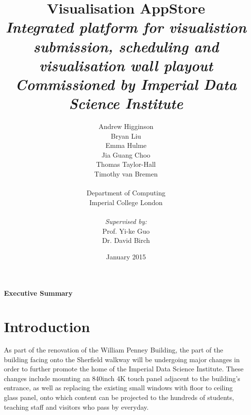 \documentclass[a4paper, titlepage]{article}
\title{Visualisation AppStore \\ \vspace{10pt}
\textit{\large Integrated platform for visualistion submission, scheduling and visualisation wall playout} \\ \vspace*{-5pt}
\textit{\large Commissioned by Imperial Data Science Institute}}
\author{Andrew Higginson\\ Bryan Liu \\ Emma Hulme \\ Jia Guang Choo \\
        Thomas Taylor-Hall \\ Timothy van Bremen \\\\ 
        Department of Computing \\ Imperial College London \\\\ \textit{Supervised by:} \\
        Prof. Yi-ke Guo \\ Dr. David Birch}
\date{January 2015}
\begin{document}
\maketitle


\newpage
{}
\Large
\textbf{Executive Summary}

\normalsize





\newpage
\tableofcontents
\listoffigures
\listoftables


\newpage
{}
\section{Introduction}
As part of the renovation of the William Penney Building, the part of the building facing onto the Sherfield walkway will be undergoing major changes in order to further promote the home of the Imperial Data Science Institute. These changes include mounting an 840inch 4K touch panel adjacent to the building's entrance, as well as replacing the existing small windows with floor to ceiling glass panel, onto which content can be projected to the hundreds of students, teaching staff and visitors who pass by everyday.
\end{document}
